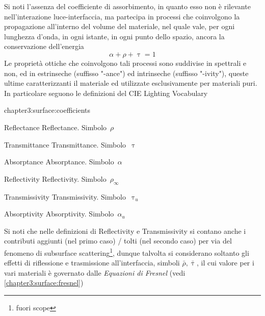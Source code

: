 Si noti l'assenza del coefficiente di assorbimento, in quanto esso non \`e rilevante nell'interazione luce-interfaccia, ma partecipa in processi che 
coinvolgono la propagazione all'interno del volume del materiale, nel quale vale, per ogni lunghezza d'onda, in ogni istante, in ogni punto dello 
spazio, ancora la conservazione dell'energia
\begin{equation}\label{chapter3:surface:bulkEnergyConservation}
	\alpha + \rho + \uptau = 1
\end{equation}
Le propriet\`a ottiche che coinvolgono tali processi sono suddivise in spettrali e non, ed in estrinseche (suffisso "-ance") ed intrinseche 
(suffisso "-ivity"), queste ultime caratterizzanti il materiale ed utilizzate esclusivamente per materiali puri. In particolare seguono le definizioni
del CIE Lighting Vocabulary
\begin{altDescription}{chapter3:surface:coefficients}\label{chapter3:surface:coefficients}
	\item[\Gls{Reflectance}] \Glsdesc{Reflectance}. \mbox{Simbolo $\si{\rho}$}
	\item[\Gls{Transmittance}] \Glsdesc{Transmittance}. \mbox{Simbolo $\si{\uptau}$}
	\item[\Gls{Absorptance}] \Glsdesc{Absorptance}. \mbox{Simbolo $\si{\alpha}$}
	\item[\Gls{Reflectivity}] \Glsdesc{Reflectivity}. \mbox{Simbolo $\si{\rho_\infty}$}
	\item[\Gls{Transmissivity}] \Glsdesc{Transmissivity}. \mbox{Simbolo $\si{\uptau_u}$}
	\item[\Gls{Absorptivity}] \Glsdesc{Absorptivity}. \mbox{Simbolo $\si{\alpha_u}$}
\end{altDescription}
Si noti che nelle definizioni di Reflectivity e Transmissivity si contano anche i contributi aggiunti (nel primo caso) / tolti (nel secondo caso) per 
via del fenomeno di subsurface scattering\footnote{fuori scope}, dunque talvolta si considerano soltanto gli effetti di riflessione e trasmissione 
all'interfaccia, simboli $\bar{\rho}, \bar{\uptau}$, il cui valore per i vari materiali \`e governato dalle \textit{Equazioni di Fresnel} 
(vedi \ref{chapter3:surface:fresnel})
